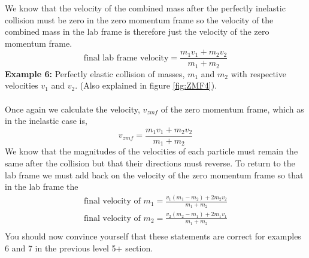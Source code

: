 \noindent We know that the velocity of the combined mass after the perfectly inelastic collision must be zero in the zero momentum frame so the velocity of the combined mass in the lab frame is therefore just the velocity of the zero momentum frame.
\begin{equation}
\mbox{final lab frame velocity}=\frac{m_1 v_1+m_2 v_2}{m_1 +m_2}
\end{equation}
\noindent
{\bf Example 6:} Perfectly elastic collision of masses, $m_1$ and $m_2$ with respective velocities $v_1$ and $v_2$.   (Also explained in figure \ref{fig:ZMF4}).
\\
\\
Once again we calculate the velocity, $v_{zmf}$ of the zero momentum frame, which as in the inelastic case is,
\begin{equation}
v_{zmf}=\frac{m_1 v_1+m_2 v_2}{m_1 +m_2}
\end{equation}
\noindent
We know that the magnitudes of the velocities of each particle must remain the same after the collision but that their directions must reverse.  To return to the lab frame we must add back on the velocity of the zero momentum frame so that in the lab frame the
\begin{eqnarray}
\mbox{final velocity of $m_1$}=\frac{v_1(m_1-m_2)+2m_2v_2}{m_1 +m_2}\nonumber\\
\mbox{final velocity of $m_2$}=\frac{v_2(m_2-m_1)+2m_1v_1}{m_1 +m_2}\nonumber\\
\end{eqnarray}
You should now convince yourself that these statements are correct for examples 6 and 7 in the previous level 5+ section.


